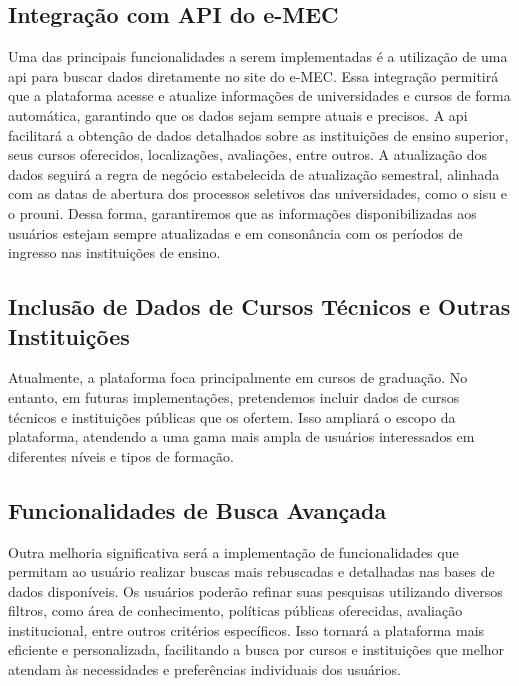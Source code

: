 \subsection{Integração com API do e-MEC}
Uma das principais funcionalidades a serem implementadas é a utilização de uma \ac{api} para buscar dados diretamente no site do e-MEC. Essa integração permitirá que a plataforma acesse e atualize informações de universidades e cursos de forma automática, garantindo que os dados sejam sempre atuais e precisos. A \ac{api} facilitará a obtenção de dados detalhados sobre as instituições de ensino superior, seus cursos oferecidos, localizações, avaliações, entre outros. A atualização dos dados seguirá a regra de negócio estabelecida de atualização semestral, alinhada com as datas de abertura dos processos seletivos das universidades, como o \ac{sisu} e o \ac{prouni}. Dessa forma, garantiremos que as informações disponibilizadas aos usuários estejam sempre atualizadas e em consonância com os períodos de ingresso nas instituições de ensino.

\subsection{Inclusão de Dados de Cursos Técnicos e Outras Instituições}
Atualmente, a plataforma foca principalmente em cursos de graduação. No entanto, em futuras implementações, pretendemos incluir dados de cursos técnicos e instituições públicas que os ofertem. Isso ampliará o escopo da plataforma, atendendo a uma gama mais ampla de usuários interessados em diferentes níveis e tipos de formação. 

\subsection{Funcionalidades de Busca Avançada}
Outra melhoria significativa será a implementação de funcionalidades que permitam ao usuário realizar buscas mais rebuscadas e detalhadas nas bases de dados disponíveis. Os usuários poderão refinar suas pesquisas utilizando diversos filtros, como área de conhecimento, políticas públicas oferecidas, avaliação institucional, entre outros critérios específicos. Isso tornará a plataforma mais eficiente e personalizada, facilitando a busca por cursos e instituições que melhor atendam às necessidades e preferências individuais dos usuários.

